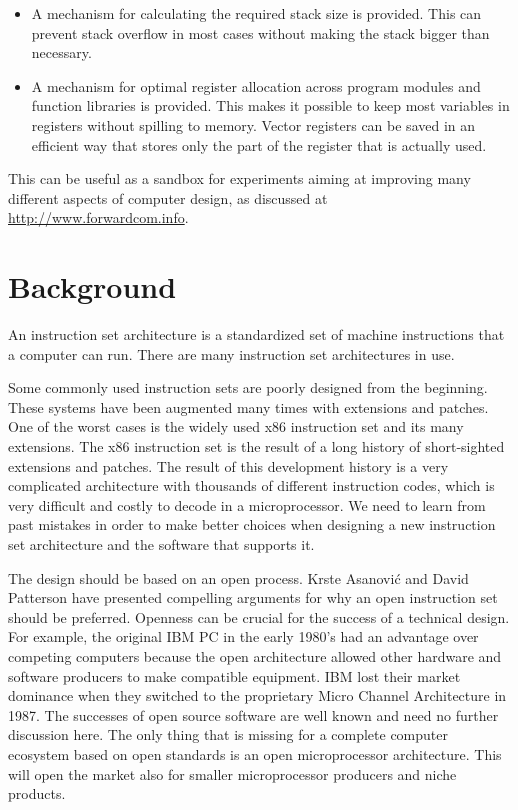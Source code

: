 \documentclass[forwardcom.tex]{subfiles}
\begin{document}
\begin{itemize}
\item A mechanism for calculating the required stack size is provided. This can prevent stack overflow in most cases without making the stack bigger than necessary.

\item A mechanism for optimal register allocation across program modules and function libraries is provided. This makes it possible to keep most variables in registers without spilling to memory. Vector registers can be saved in an efficient way that stores only the part of the register that is actually used.
\end{itemize}
\vspace{2mm}

This can be useful as a sandbox for experiments aiming at improving many different aspects of computer design, as discussed at \href{http://www.forwardcom.info}{http://www.forwardcom.info}.

\section{Background}
An instruction set architecture is a standardized set of machine instructions that a computer can run. There are many instruction set architectures in use.
\vspace{2mm}

Some commonly used instruction sets are poorly designed from the beginning. These systems have been augmented many times with extensions and patches. One of the worst cases is the widely used x86 instruction set and its many extensions. The x86 instruction set is the result of a long history of short-sighted extensions and patches. The result of this development history is a very complicated architecture with thousands of different instruction codes, which is very difficult and costly to decode in a microprocessor. We need to learn from past mistakes in order to make better choices when designing a new instruction set architecture and the software that supports it.
\vspace{2mm}

The design should be based on an open process. Krste Asanović and David Patterson have presented compelling arguments for why an open instruction set should be preferred. Openness can be crucial for the success of a technical design. For example, the original IBM PC in the early 1980's had an advantage over competing computers because the open architecture allowed other hardware and software producers to make compatible equipment. IBM lost their market dominance when they switched to the proprietary Micro Channel Architecture in 1987. The successes of open source software are well known and need no further discussion here. The only thing that is missing for a complete computer ecosystem based on open standards is an open microprocessor architecture. This will open the market also for smaller microprocessor producers and niche products.
\vspace{2mm}
\end{document}
